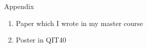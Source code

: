 \documentclass[a4paper,12pt]{ltjsarticle}
\begin{document}
\newpage

\vspace*{40pt}
\huge
\begin{center}
    Appendix
\end{center}
\normalsize
\begin{enumerate}
    \item Paper which I wrote in my master course
    \item Poster in QIT40
\end{enumerate}

\newpage

\addtolength{\oddsidemargin}{0pt}
\addtolength{\evensidemargin}{0pt}
\addtolength{\topmargin}{0pt}

\end{document}
